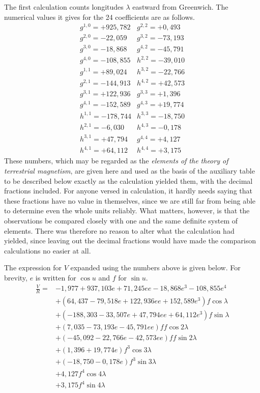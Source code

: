 The first calculation counts longitudes $\lambda$ eastward from Greenwich. The numerical values it gives for the 24 coefficients are as follows.
\[
\begin{array}{r|r}
g^{1,0}=+925{,}782&g^{2,2}=+0{,}493\\
g^{2,0}=-22{,}059&g^{3,2}=-73{,}193\\
g^{3,0}=-18{,}868&g^{4,2}=-45{,}791\\
g^{4,0}=-108{,}855&h^{2,2}=-39{,}010\\
g^{1,1}=+89{,}024&h^{3,2}=-22{,}766\\
g^{2,1}=-144{,}913&h^{4,2}=+42{,}573\\
g^{3,1}=+122{,}936&g^{3,3}=+1{,}396\\
g^{4,1}=-152{,}589&g^{4,3}=+19{,}774\\
h^{1,1}=-178{,}744&h^{3,3}=-18{,}750\\
h^{2,1}=-6{,}030&h^{4,3}=-0{,}178\\
h^{3,1}=+47{,}794&g^{4,4}=+4{,}127\\
h^{4,1}=+64{,}112&h^{4,4}=+3{,}175
\end{array}
\]
These numbers, which may be regarded as the \textit{elements of the theory of terrestrial magnetism}, are given here and used as the basis of the auxiliary table to be described below exactly as the calculation yielded them, with the decimal fractions included. For anyone versed in calculation, it hardly needs saying that these fractions have no value in themselves, since we are still far from being able to determine even the whole units reliably. What matters, however, is that the observations be compared closely with one and the same definite system of elements. There was therefore no reason to alter what the calculation had yielded, since leaving out the decimal fractions would have made the comparison calculations no easier at all.

The expression for $V$ expanded using the numbers above is given below. For brevity, $e$ is written for $\cos u$ and $f$ for $\sin u$.
\[
\begin{aligned}
\frac VR={}&-1{,}977+937{,}103e+71{,}245ee-18{,}868e^3-108{,}855e^4\\
&+(64{,}437-79{,}518e+122{,}936ee+152{,}589e^3)f\cos\lambda\\
&+(-188{,}303-33{,}507e+47{,}794ee+64{,}112e^3)f\sin\lambda\\
&+(7{,}035-73{,}193e-45{,}791ee)ff\cos2\lambda\\
&+(-45{,}092-22{,}766e-42{,}573ee)ff\sin2\lambda\\
&+(1{,}396+19{,}774e)f^3\cos3\lambda\\
&+(-18{,}750-0{,}178e)f^3\sin3\lambda\\
&+4{,}127f^4\cos4\lambda\\
&+3{,}175f^4\sin4\lambda
\end{aligned}
\]

